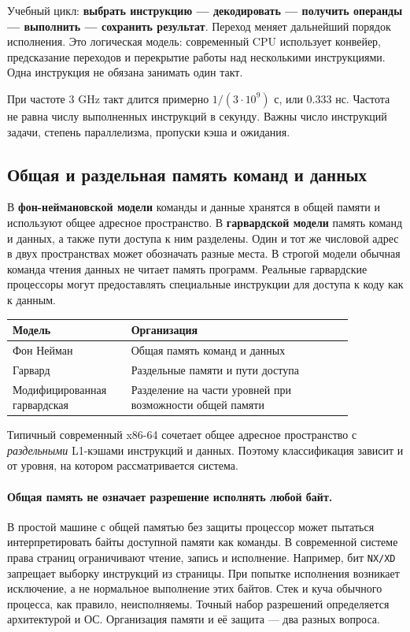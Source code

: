 Учебный цикл: \textbf{выбрать инструкцию --- декодировать --- получить
операнды --- выполнить --- сохранить результат}. Переход меняет дальнейший
порядок исполнения. Это логическая модель: современный CPU использует
конвейер, предсказание переходов и перекрытие работы над несколькими
инструкциями. Одна инструкция не обязана занимать один такт.

При частоте 3 GHz такт длится примерно $1/(3\cdot10^9)$ с, или 0.333 нс.
Частота не равна числу выполненных инструкций в секунду. Важны число
инструкций задачи, степень параллелизма, пропуски кэша и ожидания.

\subsection{Общая и раздельная память команд и данных}
В \textbf{фон-неймановской модели} команды и данные хранятся в общей памяти
и используют общее адресное пространство. В \textbf{гарвардской модели}
память команд и данных, а также пути доступа к ним разделены. Один и тот же
числовой адрес в двух пространствах может обозначать разные места.
В строгой модели обычная команда чтения данных не читает память программ.
Реальные гарвардские процессоры могут предоставлять специальные инструкции
для доступа к коду как к данным.

\begin{center}
\small
\begin{tabular}{|p{0.28\linewidth}|p{0.58\linewidth}|}
\hline
Модель & Организация \\
\hline
Фон Нейман & Общая память команд и данных \\
Гарвард & Раздельные памяти и пути доступа \\
Модифицированная гарвардская & Разделение на части уровней при возможности общей памяти \\
\hline
\end{tabular}
\end{center}

Типичный современный x86-64 сочетает общее адресное пространство с
\emph{раздельными} L1-кэшами инструкций и данных. Поэтому классификация
зависит и от уровня, на котором рассматривается система.

\paragraph{Общая память не означает разрешение исполнять любой байт.}
В простой машине с общей памятью без защиты процессор может пытаться
интерпретировать байты доступной памяти как команды. В современной системе
права страниц ограничивают чтение, запись и исполнение. Например, бит
\texttt{NX/XD} запрещает выборку инструкций из страницы. При попытке
исполнения возникает исключение, а не нормальное выполнение этих байтов.
Стек и куча обычного процесса, как правило, неисполняемы. Точный набор
разрешений определяется архитектурой и ОС. Организация памяти и её защита
--- два разных вопроса.

